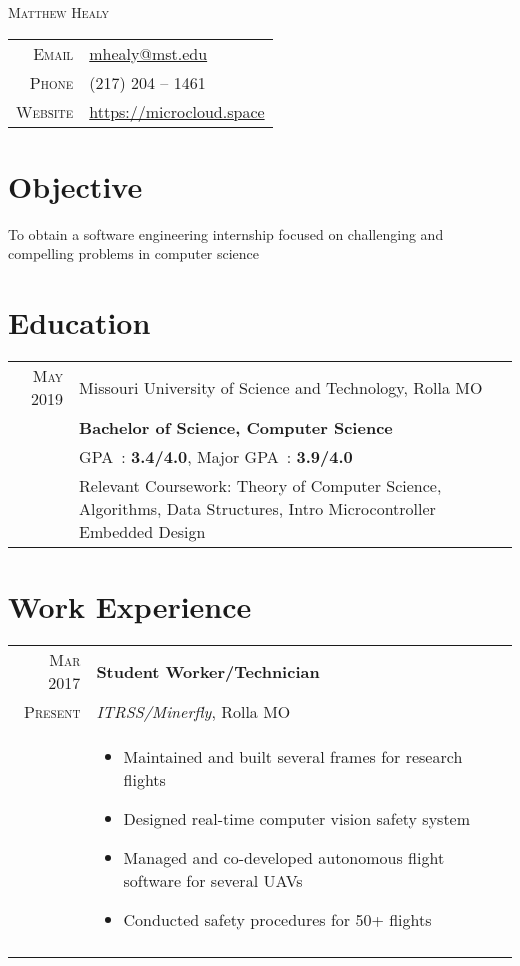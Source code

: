 \documentclass[a4paper,10pt]{article}
\newcommand{\br}{\\\multicolumn{2}{c}{}}
\begin{document}
\pagestyle{empty}

\par{\centering
    {\Huge \textsc{Matthew Healy}
}\bigskip\par}

\begin{center}
\begin{tabular}{rl}
    \textsc{Email } & \href{mailto:mhealy@mst.edu}{mhealy@mst.edu} \\
    \textsc{Phone }        & (217) 204 -- 1461  \\
    \textsc{Website }      & \url{https://microcloud.space}
\end{tabular}
\end{center}

\section{Objective}
To obtain a software engineering internship focused on challenging and compelling problems in computer science


\section{Education}
\begin{tabular}{r|p{15cm}}
    \textsc{May} 2019 & Missouri University of Science and Technology, Rolla MO  \\
                      & \textbf{Bachelor of Science, Computer Science} \\
                      & GPA~: \textbf{3.4/4.0}, Major GPA~: \textbf{3.9/4.0} \\
                      & Relevant Coursework:
                      Theory of Computer Science,
                      Algorithms,
                      Data Structures,
                      Intro Microcontroller Embedded Design
\end{tabular}


\section{Work Experience}
\begin{tabular}{r|p{15cm}}
    \textsc{Mar 2017} & \textbf{Student Worker/Technician} \\
    \textsc{Present}         & \textit{ITRSS/Minerfly}, Rolla MO \\ &
    \begin{itemize}
    \item{Maintained and built several frames for research flights}
    \item{Designed real-time computer vision safety system}
    \item{Managed and co-developed autonomous flight software for several UAVs}
    \item{Conducted safety procedures for 50+ flights}

    \end{itemize} \br\\

\end{tabular}
\end{document}
